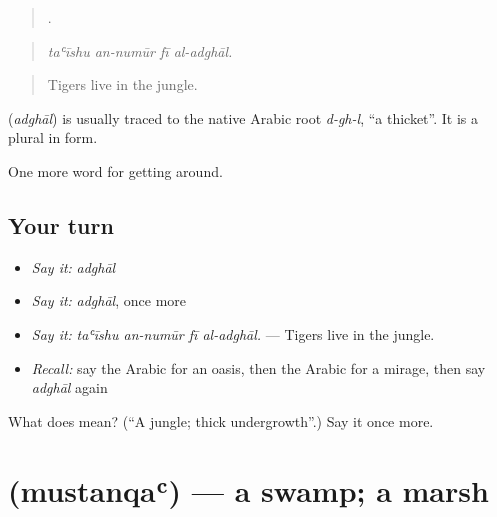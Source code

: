 \begin{quote}
   .
\end{quote}

\begin{quote}
\emph{taʿīshu an-numūr fī al-adghāl.}
\end{quote}

\begin{quote}
Tigers live in the jungle.
\end{quote}

\begin{cousinweb}
\textbf{} (\emph{adghāl}) is usually traced to the native Arabic root \emph{d-gh-l}, \textquotedblleft{}a thicket\textquotedblright{}. It is a plural in form.
\end{cousinweb}

\begin{grammarlens}[title={What you've built}]
One more word for getting around.
\end{grammarlens}

\subsection*{Your turn}
\begin{itemize}
\raggedright
  \item \emph{Say it:} \emph{adghāl}
  \item \emph{Say it:} \emph{adghāl}, once more
  \item \emph{Say it:} \emph{taʿīshu an-numūr fī al-adghāl.} — Tigers live in the jungle.
  \item \emph{Recall:} say the Arabic for an oasis, then the Arabic for a mirage, then say \emph{adghāl} again
\end{itemize}

\begin{tcolorbox}[breakable,colback=teal!4,colframe=teal!35!black,title={Before you move on}]
What does  mean? (\textquotedblleft{}A jungle; thick undergrowth\textquotedblright{}.) Say it once more.
\end{tcolorbox}
\section[\texorpdfstring{\ar{مستنقع} (mustanqaʿ)}{مستنقع (mustanqaʿ)}]{ (mustanqaʿ) — a swamp; a marsh}

\label{lesson:AR-C473-mustanqa}



